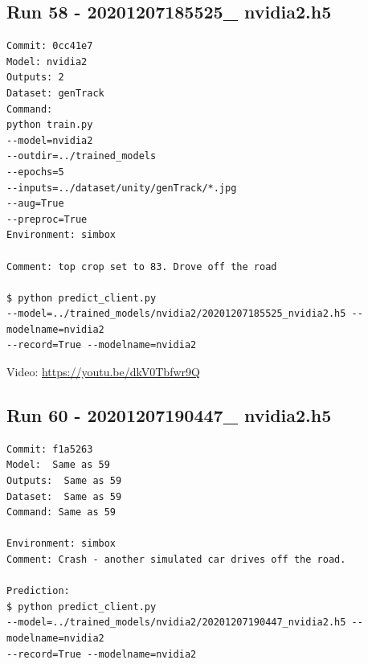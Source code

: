 \subsection{Run 58 - 20201207185525\_ nvidia2.h5}
\label{app_res:58}
\begin{verbatim}
Commit: 0cc41e7
Model: nvidia2
Outputs: 2
Dataset: genTrack   
Command:
python train.py 
--model=nvidia2
--outdir=../trained_models
--epochs=5
--inputs=../dataset/unity/genTrack/*.jpg
--aug=True
--preproc=True
Environment: simbox

Comment: top crop set to 83. Drove off the road

$ python predict_client.py 
--model=../trained_models/nvidia2/20201207185525_nvidia2.h5 --modelname=nvidia2 
--record=True --modelname=nvidia2

\end{verbatim}
Video: \url{https://youtu.be/dkV0Tbfwr9Q}

\subsection{Run 60 - 20201207190447\_ nvidia2.h5}
\label{app_res:60}
\begin{verbatim}
Commit: f1a5263
Model:  Same as 59
Outputs:  Same as 59
Dataset:  Same as 59
Command: Same as 59

Environment: simbox
Comment: Crash - another simulated car drives off the road.

Prediction:
$ python predict_client.py 
--model=../trained_models/nvidia2/20201207190447_nvidia2.h5 --modelname=nvidia2 
--record=True --modelname=nvidia2
\end{verbatim}

